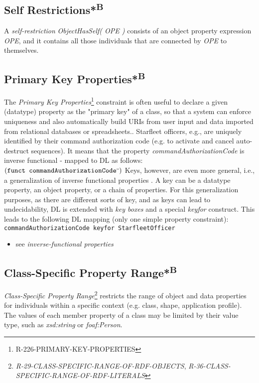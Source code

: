 \documentclass{llncs}
\newcommand{\ms}[1]{\texttt{#1}}
\begin{document}
\subsection{Self Restrictions*\textsuperscript{B}}

A \emph{self-restriction} \emph{ObjectHasSelf( OPE )} consists of an object property expression \emph{OPE}, and it contains all those individuals that are connected by \emph{OPE} to themselves. 

\subsection{Primary Key Properties*\textsuperscript{B}}

The \emph{Primary Key Properties}\footnote{R-226-PRIMARY-KEY-PROPERTIES} constraint is often useful to declare a given (datatype) property as the "primary key" of a class, so that a system can enforce uniqueness and also automatically build URIs from user input and data imported from relational databases or spreadsheets.. 
Starfleet officers, e.g., are uniquely identified by their command authorization code (e.g. to activate and cancel auto-destruct sequences).
It means that the property \emph{commandAuthorizationCode} is inverse functional - mapped to DL as follows:
$(\ms{funct commandAuthorizationCode}\sp{\overline{\ }})$
Keys, however, are even more general, i.e., a generalization of inverse functional properties \cite{Schneider2009}.
A key can be a datatype property, an object property, or a chain of properties.
For this generalization purposes, as there are different sorts of key, and as keys can lead to undecidability, 
DL is extended with \emph{key boxes} and a special \emph{keyfor} construct\cite{Lutz2005}.
This leads to the following DL mapping (only one simple property constraint):
\ms{commandAuthorizationCode \ms{keyfor} StarfleetOfficer}

\begin{itemize}
	\item see \emph{inverse-functional properties}
\end{itemize}

\subsection{Class-Specific Property Range*\textsuperscript{B}}		

{\em Class-Specific Property Range}\footnote{{\em R-29-CLASS-SPECIFIC-RANGE-OF-RDF-OBJECTS}, {\em R-36-CLASS-SPECIFIC-RANGE-OF-RDF-LITERALS}} restricts the range of object and data properties for individuals within a specific context (e.g. class, shape, application profile).
The values of each member property of a class may be limited by their value type, such as \emph{xsd:string} or \emph{foaf:Person}. 
\end{document}
